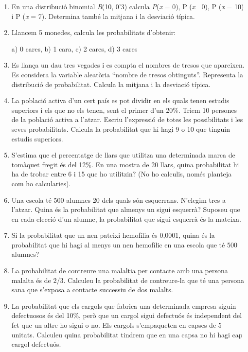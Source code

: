 \begin{enumerate}
\def\labelenumi{\arabic{enumi}.}
\item
  En una distribució binomial \emph{B}(10, 0'3) calcula
  \emph{P}(\emph{x} = 0), P (\emph{x}  0), P (\emph{x} = 10) i P
  (\emph{x} = 7). Determina també la mitjana i la desviació típica.
\item
  Llancem 5 monedes, calcula les probabilitats d'obtenir:

  a) 0 cares, b) 1 cara, c) 2 cares, d) 3 cares
\item
  Es llança un dau tres vegades i es compta el nombres de tresos que
  apareixen. Es considera la variable aleatòria ``nombre de tresos
  obtinguts''. Representa la distribució de probabilitat. Calcula la
  mitjana i la desviació típica.
\item
  La població activa d'un cert país es pot dividir en els quals tenen
  estudis superiors i els que no els tenen, sent el primer d'un 20\%.
  Triem 10 persones de la població activa a l'atzar. Escriu l'expressió
  de totes les possibilitats i les seves probabilitats. Calcula la
  probabilitat que hi hagi 9 o 10 que tinguin estudis superiors.
\item
  S'estima que el percentatge de llars que utilitza una determinada
  marca de tomàquet fregit és del 12\%. En una mostra de 20 llars, quina
  probabilitat hi ha de trobar entre 6 i 15 que ho utilitzin? (No ho
  calculis, només planteja com ho calcularies).
\item
  Una escola té 500 alumnes 20 dels quals són esquerrans. N'elegim tres
  a l'atzar. Quina és la probabilitat que almenys un sigui esquerrà?
  Suposeu que en cada elecció d'un alumne, la probabilitat que sigui
  esquerrà és la mateixa. 
\item
  Si la probabilitat que un nen pateixi hemofília és 0,0001, quina és la
  probabilitat que hi hagi al menys un nen hemofílic en una escola que
  té 500 alumnes? 
\item
  La probabilitat de contreure una malaltia per contacte amb una persona
  malalta és de 2/3. Calculeu la probabilitat de contreure-la que té una
  persona sana que s'exposa a contacte successiu de dos malalts. 
\item
  La probabilitat que els cargols que fabrica una determinada empresa
  siguin defectuosos és del 10\%, però que un cargol sigui defectuós és
  independent del fet que un altre ho sigui o no. Els cargols
  s'empaqueten en capses de 5 unitats. Calculeu quina probabilitat
  tindrem que en una capsa no hi hagi cap cargol defectuós. 

\end{enumerate}
